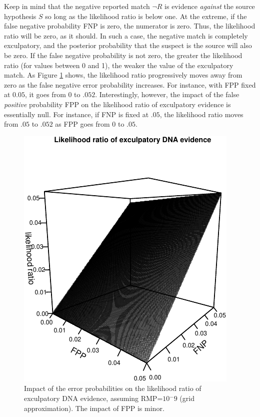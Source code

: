 \documentclass[
  10pt,
  dvipsnames,enabledeprecatedfontcommands]{scrartcl}
\begin{document}
\noindent Keep in mind that the negative reported match \(\neg R\) is
evidence \textit{against} the source hypothesis \(S\) so long as the
likelihood ratio is below one. At the extreme, if the false negative
probability FNP is zero, the numerator is zero. Thus, the likelihood
ratio will be zero, as it should. In such a case, the negative match is
completely exculpatory, and the posterior probability that the suspect
is the source will also be zero. If the false negative probability is
not zero, the greater the likelihood ratio (for values between 0 and 1),
the weaker the value of the exculpatory match. As Figure
\ref{fig:fpfnplr-exc} shows, the likelihood ratio progressively moves
away from zero as the false negative error probability increases. For
instance, with FPP fixed at \(0.05\), it goes from 0 to \(.052\).
Interestingly, however, the impact of the false \textit{positive}
probability FPP on the likelihood ratio of exculpatory evidence is
essentially null. For instance, if FNP is fixed at \(.05\), the
likelihood ratio moves from \(.05\) to \(.052\) as FPP goes from 0 to
\(.05\).

\begin{figure}[t]

\begin{center}\includegraphics[width=1\linewidth]{lr-chapter6_files/figure-latex/fig-fpfnplr-exc-1} \end{center}
\caption{Impact of the error probabilities on the likelihood ratio of exculpatory DNA evidence, assuming  \mbox{RMP=$10{^-9}$} (grid approximation). The impact of FPP is minor.}
\label{fig:fpfnplr-exc}
\end{figure}
\end{document}
